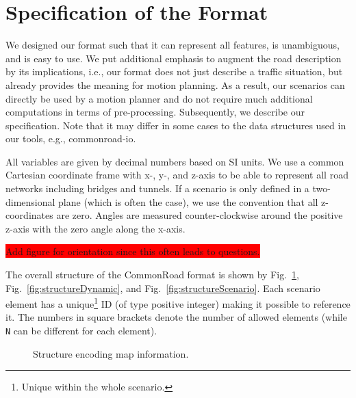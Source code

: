 

\section{Specification of the Format}

We designed our format such that it can represent all features, is unambiguous, and is easy to use. 
We put additional emphasis to augment the road description by its implications, i.e., our format does not just describe a traffic situation, but already provides the meaning for motion planning.
As a result, our scenarios can directly be used by a motion planner and do not require much additional computations in terms of pre-processing.
Subsequently, we describe our specification.
Note that it may differ in some cases to the data structures used in our tools, e.g., commonroad-io.

All variables are given by decimal numbers based on SI units. We use a common Cartesian coordinate frame with x-, y-, and z-axis to be able to represent all road networks including bridges and tunnels. 
If a scenario is only defined in a two-dimensional plane (which is often the case), we use the convention that all z-coordinates are zero.
Angles are measured counter-clockwise around the positive z-axis with the zero angle along the x-axis.

\colorbox{red}{Add figure for orientation since this often leads to questions.}

The overall structure of the CommonRoad format is shown by Fig.~\ref{fig:structureMap}, Fig.~\ref{fig:structureDynamic}, and Fig.~\ref{fig:structureScenario}. 
Each scenario element has a unique\footnote{Unique within the whole scenario.} ID (of type positive integer) making it possible to reference it.
The numbers in square brackets denote the number of allowed elements (while \texttt{N} can be different for each element).


\begin{figure}[!htpb]
	\small
	\caption{Structure encoding map information.}
	\label{fig:structureMap}
\end{figure}


